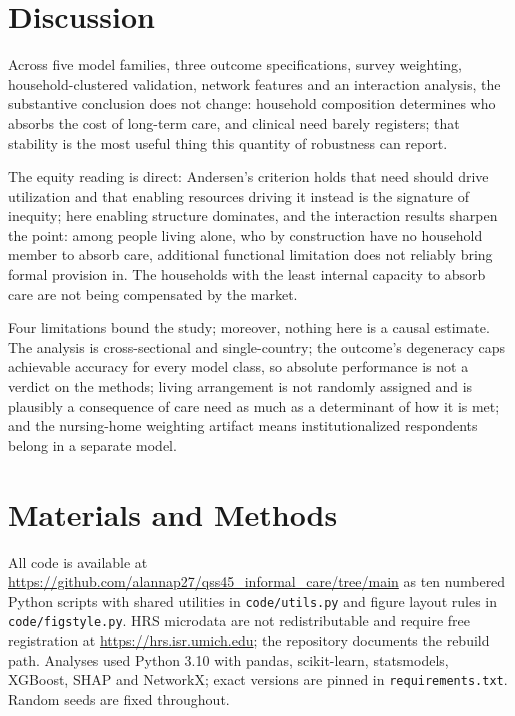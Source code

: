\documentclass[9pt,twoside]{pnas-new}
\begin{document}
\section*{Discussion}

Across five model families, three outcome specifications, survey weighting,
household-clustered validation, network features and an interaction analysis,
the substantive conclusion does not change: household composition determines who
absorbs the cost of long-term care, and clinical need barely registers; that
stability is the most useful thing this quantity of robustness can report.

The equity reading is direct: Andersen's criterion holds that need should drive
utilization and that enabling resources driving it instead is the signature of
inequity; here enabling structure dominates, and the interaction results
sharpen the point: among people living alone, who by construction have no
household member to absorb care, additional functional limitation does not
reliably bring formal provision in. The households with the least internal
capacity to absorb care are not being compensated by the market.

Four limitations bound the study; moreover, nothing here is a
causal estimate. The analysis is cross-sectional and single-country;
the outcome's degeneracy caps achievable accuracy for every model class, so
absolute performance is not a verdict on the methods; living arrangement is not
randomly assigned and is plausibly a consequence of care need as much as a
determinant of how it is met; and the nursing-home weighting artifact means
institutionalized respondents belong in a separate model. 

\section*{Materials and Methods}

All code is available at \url{https://github.com/alannap27/qss45_informal_care/tree/main}
as ten numbered Python scripts with shared utilities in \texttt{code/utils.py}
and figure layout rules in \texttt{code/figstyle.py}. HRS microdata are not
redistributable and require free registration at \url{https://hrs.isr.umich.edu};
the repository documents the rebuild path. Analyses used Python 3.10 with pandas,
scikit-learn, statsmodels, XGBoost, SHAP and NetworkX; exact versions are pinned
in \texttt{requirements.txt}. Random seeds are fixed throughout.

\end{document}
